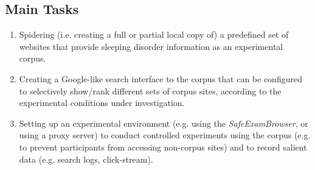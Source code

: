 \documentclass[]{usiinfbachelorproject}
\begin{document}
\subsection{Main Tasks}
    \begin{enumerate}

        \item Spidering (i.e. creating a full or partial local copy of) a predefined set of websites that provide
              sleeping disorder information as an experimental corpus. 

        \item Creating a Google-like search interface to the corpus that can be configured to selectively show/rank different sets of
              corpus sites, according to the experimental conditions under investigation.

        \item Setting up an experimental environment (e.g. using the \emph{SafeExamBrowser}, or using a proxy server) to
              conduct controlled experiments using the corpus (e.g. to prevent participants from accessing non-corpus sites)
              and to record salient data (e.g. search logs, click-stream).

    \end{enumerate} 
\end{document}
